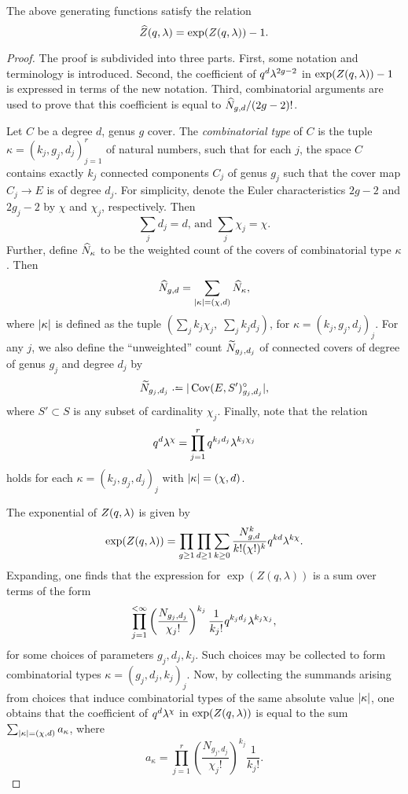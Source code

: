 \begin{lemma} \label{prop:connection-reduction}
 The above generating functions satisfy the relation \[\widehat{Z}(q,\lambda) = \exp(Z(q,\lambda)) - 1.\]
\end{lemma}
\begin{proof}
The proof is subdivided into three parts. First, some notation and terminology is introduced. Second, the coefficient of $q^{d}\lambda^{2g-2}$ in $\exp(Z(q,\lambda)) - 1$ is expressed in terms of the new notation. Third, combinatorial arguments are used to prove that this coefficient is equal to $\widehat{N}_{g,d}/(2g-2)!$.

 Let $C$ be a degree $d$, genus $g$ cover. The \emph{combinatorial type} of $C$ is the tuple $\kappa=(k_j,g_j,d_j)_{j=1}^r$ of natural numbers, such that for each $j$, the space $C$ contains exactly $k_j$ connected components $C_j$ of genus $g_j$ such that the cover map $C_j\to E$ is of degree $d_j$. For simplicity, denote the Euler characteristics $2g-2$ and $2g_j-2$ by $\chi$ and $\chi_j$, respectively. Then
 \[\sum_j d_j=d\text{, and }\sum_j \chi_j=\chi.\]
 Further, define $\widehat{N}_\kappa$ to be the weighted count of the covers of combinatorial type $\kappa$. Then
 \[
  \widehat{N}_{g,d}=\sum_{|\kappa|=(\chi,d)}\widehat{N}_\kappa,
 \]
 where $|\kappa|$ is defined as the tuple $(\sum_j k_j\chi_j,\;\sum_j k_jd_j)$, for $\kappa=(k_j,g_j,d_j)_j$. For any $j$, we also define the ``unweighted'' count $\widetilde{N}_{g_j,d_j}$ of connected covers of degree of genus $g_j$ and degree $d_j$ by
 \[\wtilde{N}_{g_j,d_j}\defeq\abs{\Cov(E,S')^{\circ}_{g_j,d_j}},\]
 where $S'\subset S$ is any subset of cardinality $\chi_j$.
 Finally, note that the relation
 \[
  q^d\lambda^\chi=\prod_{j=1}^r q^{k_jd_j}\lambda^{k_j\chi_j}
 \]
 holds for each $\kappa=(k_j,g_j,d_j)_j$ with $|\kappa|=(\chi,d)$.

 The exponential of $Z(q,\lambda)$ is given by 
 \[
  \exp(Z(q,\lambda))=\prod_{g\geq 1}\prod_{d\geq 1}\sum_{k\geq 0}\frac{N^k_{g,d}}{k!(\chi!)^k}q^{kd}\lambda^{k\chi}.
 \]
 Expanding, one finds that the expression for $\exp(Z(q,\lambda))$ is a sum over terms of the form
 \[
  \prod_{j=1}^{<\infty}\left(\frac{N_{g_j,d_j}}{\chi_j!}\right)^{k_j}\frac{1}{k_j!}q^{k_jd_j}\lambda^{k_j\chi_j},
 \]
 for some choices of parameters $g_j, d_j, k_j$. Such choices may be collected to form combinatorial types $\kappa=(g_j,d_j,k_j)_j$. Now, by collecting the summands arising from choices that induce combinatorial types of the same absolute value $|\kappa|$, one obtains that the coefficient of $q^d\lambda^\chi$ in $\exp(Z(q,\lambda))$ is equal to the sum $\sum_{|\kappa|=(\chi,d)}a_\kappa$, where 
 \[
  a_\kappa=\prod_{j=1}^{r}\left(\frac{N_{g_j,d_j}}{\chi_j!}\right)^{k_j}\frac{1}{k_j!}.
 \]


\end{proof}
